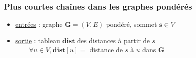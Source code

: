 \begin{frame}
  \frametitle{Plus courtes chaînes dans les graphes pondérés}
  \begin{itemize}
  \item[] \underline{entrées} : graphe $\mathbf{G} = (V,E)$ pondéré, sommet
    $\mathbf{s} \in V$
  \item[] \underline{sortie} : tableau $\mathbf{dist}$ des distances à partir de $s$  \\
    $~~~~~~~~~\forall u \in V, \mathbf{dist}[u] = $ distance de $s$ à $u$ dans $\mathbf{G}$
  \end{itemize}

\end{frame}

